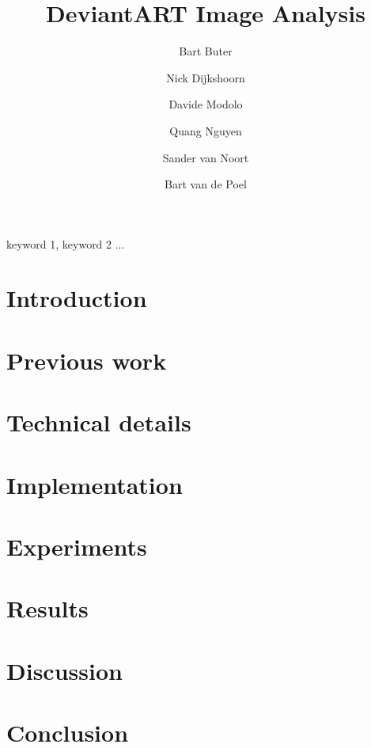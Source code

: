 \documentclass[%
        final,
        notitlepage,
        narroweqnarray,
        inline,
        ]{ieee}
\begin{document}
\title{DeviantART Image Analysis}
\author{Bart Buter \and Nick Dijkshoorn \and Davide Modolo \and Quang Nguyen \and Sander van Noort \and Bart van de Poel}


\maketitle


\begin{abstract}

\end{abstract}


\begin{keywords}
keyword 1, keyword 2 ...
\end{keywords}


\section{Introduction}



\section{Previous work}



\section{Technical details}



\section{Implementation}



\section{Experiments}



\section{Results}



\section{Discussion}



\section{Conclusion}





\end{document}
